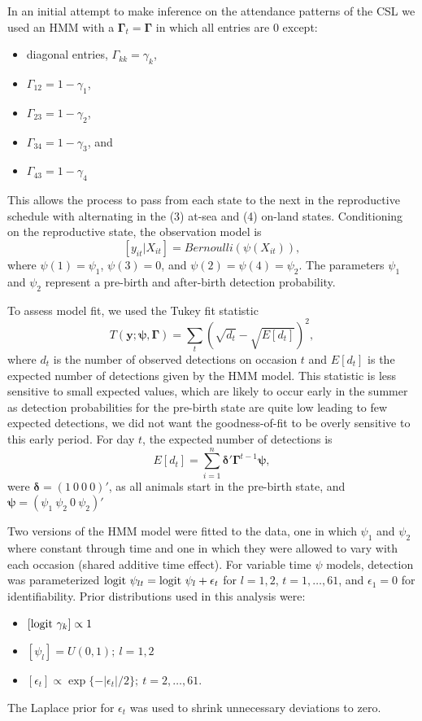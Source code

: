 \documentclass[12pt,english]{article}
\begin{document}
\begin{spacing}{1.9}
In an initial attempt to make inference on the attendance patterns of the CSL we used an HMM with a $\boldsymbol{\Gamma}_t = \boldsymbol{\Gamma}$ in which all entries are 0 except:
\begin{itemize}
\item diagonal entries, $\Gamma_{kk} = \gamma_k$, 
\item $\Gamma_{12} = 1-\gamma_1$,
\item $\Gamma_{23} = 1-\gamma_2$,
\item $\Gamma_{34} = 1-\gamma_3$, and 
\item $\Gamma_{43} = 1-\gamma_4$
\end{itemize}
 This allows the process to pass from each state to the next in the reproductive schedule with alternating in the (3) at-sea and (4) on-land states. Conditioning on the reproductive state, the observation model is
 $$
 [y_{it}|X_{it}] = Bernoulli(\psi(X_{it})),
 $$
 where $\psi(1) = \psi_1$, $\psi(3) = 0$, and $\psi(2) = \psi(4) = \psi_2$. The parameters $\psi_1$ and $\psi_2$ represent a pre-birth and after-birth detection probability. 
 
 To assess model fit, we used the Tukey fit statistic 
 \begin{equation}
 T(\mathbf{y}; \boldsymbol{\psi},\boldsymbol{\Gamma}) =  \sum_t\left(\sqrt{d_t} - \sqrt{E[d_t]}\right)^2,
 \end{equation} 
 where $d_t$ is the number of observed detections on occasion $t$ and $E[d_t]$ is the expected number of detections given by the HMM model. This statistic is less sensitive to small expected values, which are likely to occur early in the summer as detection probabilities for the pre-birth state are quite low leading to few expected detections, we did not want the goodness-of-fit to be overly sensitive to this early period. For day $t$, the expected number of detections is
 \begin{equation}
 E[d_t] = \sum_{i=1}^n \boldsymbol{\delta}'\boldsymbol{\Gamma}^{t-1}\boldsymbol{\psi},
 \end{equation}
 were $\boldsymbol{\delta} = (1\ 0\ 0\ 0)'$, as all animals start in the pre-birth state, and $\boldsymbol{\psi} = (\psi_1\ \psi_2\ 0\ \psi_2)'$
 
 Two versions of the HMM model were fitted to the data, one in which $\psi_1$ and $\psi_2$ where constant through time and one in which they were allowed to vary with each occasion (shared additive time effect). For variable time $\psi$ models, detection was parameterized ${\rm logit}\ \psi_{lt} = \mbox{logit } \psi_l + \epsilon_t$ for $l=1,2$, $t=1,\dots,61$, and $\epsilon_1 = 0$ for identifiability. Prior distributions used in this analysis were:
 \begin{itemize}
 \item $[{\rm logit}\ \gamma_k] \propto 1$
 \item $[\psi_l] = U(0,1);\ l=1,2$
 \item $[\epsilon_t] \propto \exp\{-|\epsilon_t|/2\};\ t=2,\dots,61$.
 \end{itemize} 
  The Laplace prior for $\epsilon_t$ was used to shrink unnecessary deviations to zero. 
  

\end{spacing}
\end{document}
